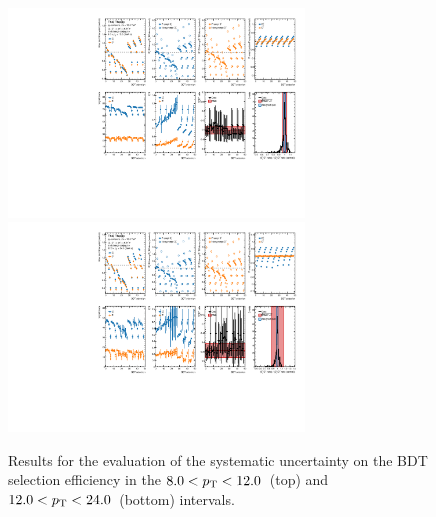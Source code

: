 \begin{figure}
    \centering
    \includegraphics[width=0.7\textwidth]{Figures/Chapter 6/AllSystBDT/BDTsyst12.pdf}
    \includegraphics[width=0.7\textwidth]{Figures/Chapter 6/AllSystBDT/BDTsyst13.pdf}
    \caption{Results for the evaluation of the systematic uncertainty on the BDT selection efficiency in the $8.0 < p_\mathrm{T} < 12.0$~\gevc (top) and $12.0 < p_\mathrm{T} < 24.0$~\gevc (bottom) intervals.}
    \end{figure}
